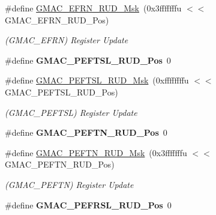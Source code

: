\begin{DoxyCompactItemize}
\#define \mbox{\hyperlink{group__SAMV71__GMAC_gaf409374ab1a25350a41fe969a03ae076}{G\+M\+A\+C\+\_\+\+E\+F\+R\+N\+\_\+\+R\+U\+D\+\_\+\+Msk}}~(0x3fffffffu $<$$<$ G\+M\+A\+C\+\_\+\+E\+F\+R\+N\+\_\+\+R\+U\+D\+\_\+\+Pos)
\begin{DoxyCompactList}\small\item\em (G\+M\+A\+C\+\_\+\+E\+F\+RN) Register Update \end{DoxyCompactList}\item 
\mbox{\label{group__SAMV71__GMAC_ga397295b99bba3fbee9a437229ccfb05c}} 
\#define {\bfseries G\+M\+A\+C\+\_\+\+P\+E\+F\+T\+S\+L\+\_\+\+R\+U\+D\+\_\+\+Pos}~0
\item 
\mbox{\label{group__SAMV71__GMAC_ga504830271c3b00455ab1bae2104d658b}} 
\#define \mbox{\hyperlink{group__SAMV71__GMAC_ga504830271c3b00455ab1bae2104d658b}{G\+M\+A\+C\+\_\+\+P\+E\+F\+T\+S\+L\+\_\+\+R\+U\+D\+\_\+\+Msk}}~(0xffffffffu $<$$<$ G\+M\+A\+C\+\_\+\+P\+E\+F\+T\+S\+L\+\_\+\+R\+U\+D\+\_\+\+Pos)
\begin{DoxyCompactList}\small\item\em (G\+M\+A\+C\+\_\+\+P\+E\+F\+T\+SL) Register Update \end{DoxyCompactList}\item 
\mbox{\label{group__SAMV71__GMAC_ga10388983ca0eb5a75ab87397197b33c1}} 
\#define {\bfseries G\+M\+A\+C\+\_\+\+P\+E\+F\+T\+N\+\_\+\+R\+U\+D\+\_\+\+Pos}~0
\item 
\mbox{\label{group__SAMV71__GMAC_ga7d8238d107b30d94774eb27bb50baf02}} 
\#define \mbox{\hyperlink{group__SAMV71__GMAC_ga7d8238d107b30d94774eb27bb50baf02}{G\+M\+A\+C\+\_\+\+P\+E\+F\+T\+N\+\_\+\+R\+U\+D\+\_\+\+Msk}}~(0x3fffffffu $<$$<$ G\+M\+A\+C\+\_\+\+P\+E\+F\+T\+N\+\_\+\+R\+U\+D\+\_\+\+Pos)
\begin{DoxyCompactList}\small\item\em (G\+M\+A\+C\+\_\+\+P\+E\+F\+TN) Register Update \end{DoxyCompactList}\item 
\mbox{\label{group__SAMV71__GMAC_ga14f3070613f00df9a4a459f3c71e28e6}} 
\#define {\bfseries G\+M\+A\+C\+\_\+\+P\+E\+F\+R\+S\+L\+\_\+\+R\+U\+D\+\_\+\+Pos}~0
\item 
\mbox{\label{group__SAMV71__GMAC_ga38c6f5b7e50672e5c6297b2dde737c68}} 
$$
\end{DoxyCompactItemize}
